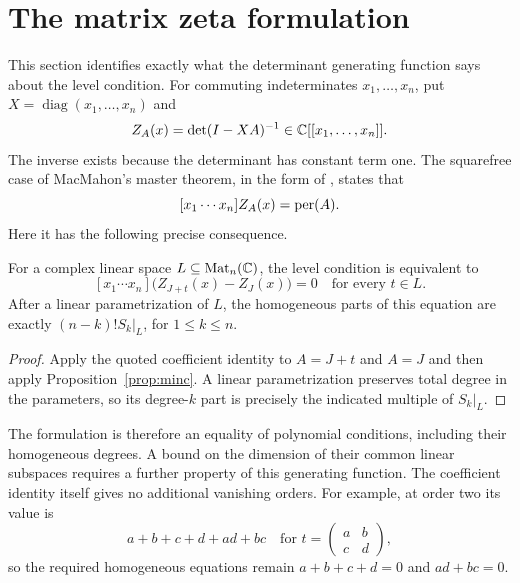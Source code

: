 \section{The matrix zeta formulation}
This section identifies exactly what the determinant generating function says about the level condition.
For commuting indeterminates $x_1,\ldots,x_n$, put $X=\operatorname{diag}(x_1,\ldots,x_n)$ and
\[
 Z_A(x)=\det(I-XA)^{-1}\in\mathbb C[[x_1,\ldots,x_n]].
\]
The inverse exists because the determinant has constant term one.
The squarefree case of MacMahon's master theorem, in the form of
\citet[Corollary~2.2, p.~608]{GJMaster}, states that
\[
 [x_1\cdots x_n]Z_A(x)=\operatorname{per}(A).
\]
Here it has the following precise consequence.

\begin{proposition}\label{prop:zeta}
For a complex linear space $L\subseteq\operatorname{Mat}_n(\mathbb C)$, the level condition is equivalent to
\[
 [x_1\cdots x_n]\bigl(Z_{J+t}(x)-Z_J(x)\bigr)=0
 \quad\text{for every }t\in L.
\]
After a linear parametrization of $L$, the homogeneous parts of this equation are exactly
$(n-k)!S_k|_L$, for $1\leq k\leq n$.
\end{proposition}
\begin{proof}
Apply the quoted coefficient identity to $A=J+t$ and $A=J$ and then apply
Proposition~\ref{prop:minc}. A linear parametrization preserves total degree in the parameters, so its degree-$k$ part is precisely the indicated multiple of $S_k|_L$.
\end{proof}

The formulation is therefore an equality of polynomial conditions, including their homogeneous degrees. A bound on the dimension of their common linear subspaces requires a further property of this generating function. The coefficient identity itself gives no additional vanishing orders. For example, at order two its value is
\[
 a+b+c+d+ad+bc
 \quad\text{for }t=\begin{pmatrix}a&b\\c&d\end{pmatrix},
\]
so the required homogeneous equations remain $a+b+c+d=0$ and $ad+bc=0$.
